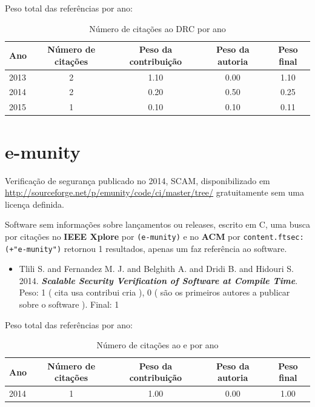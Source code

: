 Peso total das referências por ano:

\begin{table}[h]
\caption{Número de citações ao DRC  por ano}
\centering
\begin{tabular}{| l | c | c | c | c |}
  \hline
  Ano & Número de citações & Peso da contribuição & Peso da autoria & Peso final \\
  \hline
  2013
    & 2
    & 1.10
    & 0.00
    & 1.10 \\
  2014
    & 2
    & 0.20
    & 0.50
    & 0.25 \\
  2015
    & 1
    & 0.10
    & 0.10
    & 0.11 \\
  \hline
\end{tabular}
\end{table}


\section{e-munity}

Verificação de segurança
publicado no 2014, SCAM,
disponibilizado em \url{http://sourceforge.net/p/emunity/code/ci/master/tree/}
gratuitamente
sem uma licença definida.

Software sem informações sobre lançamentos ou releases,
escrito em C,
uma busca por citações no {\bf IEEE Xplore} por
\texttt{(e-munity)}
e no {\bf ACM} por
\texttt{content.ftsec:(+"e-munity")}
retornou
1 resultados,
apenas um faz referência ao software.

\begin{itemize}
\item Tlili S. and Fernandez M. J. and Belghith A. and Dridi B. and Hidouri S.
      2014.
        \textbf{\textit{ Scalable Security Verification of Software at Compile Time}}.
      Peso:
      1 (
          cita
          usa
          contribui
          cria
      ),
      0 (
são os primeiros autores a publicar sobre o software
      ).
      Final:
      1

\end{itemize}

Peso total das referências por ano:

\begin{table}[h]
\caption{Número de citações ao e por ano}
\centering
\begin{tabular}{| l | c | c | c | c |}
  \hline
  Ano & Número de citações & Peso da contribuição & Peso da autoria & Peso final \\
  \hline
  2014
    & 1
    & 1.00
    & 0.00
    & 1.00 \\
  \hline
\end{tabular}
\end{table}


